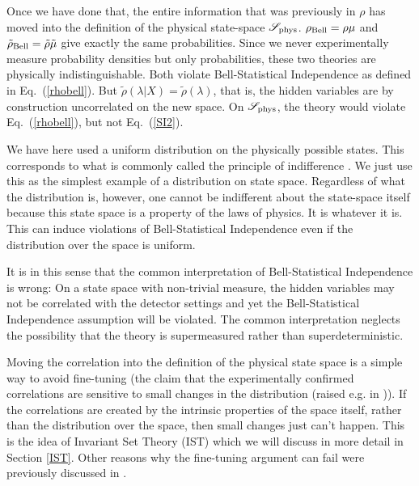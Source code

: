 \documentclass[12pt]{article}
\begin{document}
Once we have done that, the entire information that was previously in $\rho$ has moved into the definition of the physical state-space ${\mathscr S}_{\rm phys}$. 
$\rho_{\rm Bell} = \rho \mu$ and $\tilde \rho_{\rm Bell} = \tilde \rho \tilde \mu$ give exactly the same probabilities. Since we never experimentally measure probability densities but only probabilities, these two theories are physically indistinguishable. Both violate Bell-Statistical Independence as defined in Eq.\ (\ref{rhobell}). But $\tilde \rho(\lambda |X ) = \tilde \rho(\lambda)$, that is, the hidden variables are by construction uncorrelated on the new space. On ${\mathscr S}_{\rm phys}$, the theory would violate Eq.\ (\ref{rhobell}), but not Eq.\ (\ref{SI2}). 

We have here used a uniform distribution on the physically possible states. This corresponds to what is commonly called the principle of indifference \mbox{\cite{keynes1921treatise}}. We just use this as the simplest example of a distribution on state space. Regardless of what the distribution is, however, one cannot be indifferent about the state-space itself because this state space is a property of the laws of physics. It is whatever it is. This can induce violations of Bell-Statistical Independence even if the distribution over the space is uniform.

It is in this sense that the common interpretation of Bell-Statistical Independence is wrong: On a state space with non-trivial measure, the hidden variables may not be correlated with the detector settings and yet the Bell-Statistical Independence assumption will be violated. The common interpretation neglects the possibility that the theory is supermeasured rather than superdeterministic.

Moving the correlation into the definition of the physical state space is a simple way to avoid fine-tuning (the claim that the experimentally confirmed correlations are sensitive to small changes in the distribution (raised e.g. in \cite{Sen2020Superdet2,Wood2015FineTuning})). If the correlations are created by the intrinsic properties of the space itself, rather than the distribution over the space, then small changes just can't happen. This is the idea of Invariant Set Theory ({\sc IST}) \cite{Palmer2020Discretization} which we will discuss in more detail in Section \ref{IST}. Other reasons why the fine-tuning argument can fail were previously discussed in \cite{Hossenfelder2020SuperdeterminismGuide,Wharton2019Reformulations,Donadi2020SuperdetToy}.
\end{document}
